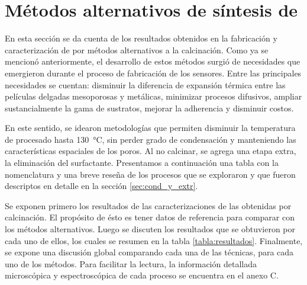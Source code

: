 \section{Métodos alternativos de síntesis de \pdm}
	
	 En esta sección se da cuenta de los resultados obtenidos en la fabricación y caracterización de \pdm\space por métodos alternativos a la calcinación. Como ya se mencionó anteriormente, el desarrollo de estos métodos surgió de necesidades que emergieron durante el proceso de fabricación de los sensores. Entre las principales necesidades se cuentan: disminuir la diferencia de expansión térmica entre las películas delgadas mesoporosas y metálicas, minimizar procesos difusivos, ampliar sustancialmente la gama de sustratos, mejorar la adherencia y disminuir costos.

	 En este sentido, se idearon metodologías que permiten disminuir la temperatura de procesado hasta \SI{130}{\celsius}, sin perder grado de condensación y manteniendo las características espaciales de los poros. Al no calcinar, se agrega una etapa extra, la eliminación del surfactante. Presentamos a continuación una tabla con la nomenclatura y una breve reseña de los procesos que se exploraron y que fueron descriptos en detalle en la sección \ref{sec:cond_y_extr}.

	 Se exponen primero los resultados de las caracterizaciones de las \pdm\space obtenidas por calcinación. El propósito de ésto es tener datos de referencia para comparar con los métodos alternativos. Luego se discuten los resultados que se obtuvieron por cada uno de ellos, los cuales se resumen en la tabla \ref{tabla:resultados}. Finalmente, se expone una discusión global comparando cada una de las técnicas, para cada uno de los métodos. Para facilitar la lectura, la información detallada microscópica y espectroscópica de cada proceso se encuentra en el anexo C.
	 
